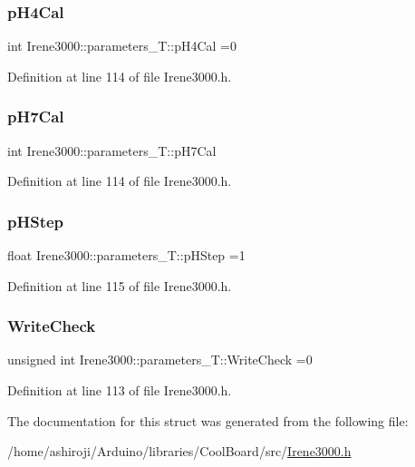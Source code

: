 \subsubsection{\texorpdfstring{p\+H4\+Cal}{pH4Cal}}
{\footnotesize\ttfamily int Irene3000\+::parameters\+\_\+\+T\+::p\+H4\+Cal =0}



Definition at line 114 of file Irene3000.\+h.

\mbox{\label{struct_irene3000_1_1parameters___t_a21265466a570d84bff914f26d2f7a03e}} 
\subsubsection{\texorpdfstring{p\+H7\+Cal}{pH7Cal}}
{\footnotesize\ttfamily int Irene3000\+::parameters\+\_\+\+T\+::p\+H7\+Cal}



Definition at line 114 of file Irene3000.\+h.

\mbox{\label{struct_irene3000_1_1parameters___t_a61cfcc2539d5f630e9071f3753aba9fe}} 
\subsubsection{\texorpdfstring{p\+H\+Step}{pHStep}}
{\footnotesize\ttfamily float Irene3000\+::parameters\+\_\+\+T\+::p\+H\+Step =1}



Definition at line 115 of file Irene3000.\+h.

\mbox{\label{struct_irene3000_1_1parameters___t_a56f1f14d33a69300d580eda2dc52cecd}} 
\subsubsection{\texorpdfstring{Write\+Check}{WriteCheck}}
{\footnotesize\ttfamily unsigned int Irene3000\+::parameters\+\_\+\+T\+::\+Write\+Check =0}



Definition at line 113 of file Irene3000.\+h.



The documentation for this struct was generated from the following file\+:\begin{DoxyCompactItemize}
\item 
/home/ashiroji/\+Arduino/libraries/\+Cool\+Board/src/\hyperlink{_irene3000_8h}{Irene3000.\+h}\end{DoxyCompactItemize}
